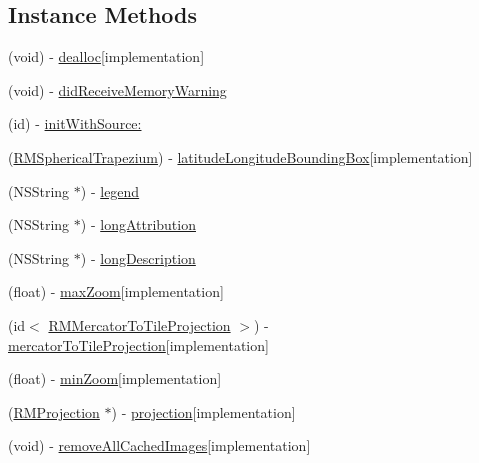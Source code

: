 \subsection*{Instance Methods}
\begin{DoxyCompactItemize}
\item 
(void) -\/ \hyperlink{interface_r_m_cached_tile_source_acbfb800e18f97d6b0aa62a1e51c4a34d}{dealloc}{\ttfamily  \mbox{[}implementation\mbox{]}}
\item 
(void) -\/ \hyperlink{interface_r_m_cached_tile_source_a2a17377fc15beaea12ef271cc0c7910b}{did\-Receive\-Memory\-Warning}
\item 
(id) -\/ \hyperlink{interface_r_m_cached_tile_source_a67899f6340f78fad6ec0e9fec134165d}{init\-With\-Source\-:}
\item 
(\hyperlink{struct_r_m_spherical_trapezium}{R\-M\-Spherical\-Trapezium}) -\/ \hyperlink{interface_r_m_cached_tile_source_a18bb86664692698478705d78ff100bf1}{latitude\-Longitude\-Bounding\-Box}{\ttfamily  \mbox{[}implementation\mbox{]}}
\item 
(N\-S\-String $\ast$) -\/ \hyperlink{interface_r_m_cached_tile_source_a09c61195fbb3b3b41d025b092c830455}{legend}
\item 
(N\-S\-String $\ast$) -\/ \hyperlink{interface_r_m_cached_tile_source_ad9da1c346c64d04310f4f1c3a1ec43e7}{long\-Attribution}
\item 
(N\-S\-String $\ast$) -\/ \hyperlink{interface_r_m_cached_tile_source_ad9402dc9453199fcb71127d0ff137ab8}{long\-Description}
\item 
(float) -\/ \hyperlink{interface_r_m_cached_tile_source_a0946e8601ca057c889341e6238ea12b8}{max\-Zoom}{\ttfamily  \mbox{[}implementation\mbox{]}}
\item 
(id$<$ \hyperlink{protocol_r_m_mercator_to_tile_projection-p}{R\-M\-Mercator\-To\-Tile\-Projection} $>$) -\/ \hyperlink{interface_r_m_cached_tile_source_a611ec223df3c49d9ccb6b29670e7c65a}{mercator\-To\-Tile\-Projection}{\ttfamily  \mbox{[}implementation\mbox{]}}
\item 
(float) -\/ \hyperlink{interface_r_m_cached_tile_source_adf9a9a4074baf19c89210b1fca0ed32f}{min\-Zoom}{\ttfamily  \mbox{[}implementation\mbox{]}}
\item 
(\hyperlink{interface_r_m_projection}{R\-M\-Projection} $\ast$) -\/ \hyperlink{interface_r_m_cached_tile_source_a7fd23ce549a314c91034127da0ce5c8a}{projection}{\ttfamily  \mbox{[}implementation\mbox{]}}
\item 
(void) -\/ \hyperlink{interface_r_m_cached_tile_source_a07c40b88ceb0b2d8fed56f35ea52e82a}{remove\-All\-Cached\-Images}{\ttfamily  \mbox{[}implementation\mbox{]}}

\end{DoxyCompactItemize}
